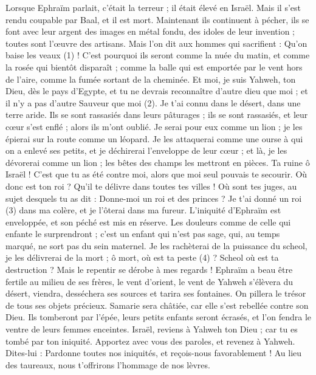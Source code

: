 \begin{multicols}{2}
\VerseOne{}Lorsque Ephraïm parlait, c’était la terreur ; il était élevé en Israël. Mais il s'est rendu coupable par Baal, et il est mort.
Maintenant ils continuent à pécher, ils se font avec leur argent des images en métal fondu, des idoles de leur invention ; toutes sont l’œuvre des artisans. Mais l’on dit aux hommes qui sacrifient : Qu’on baise les veaux (1) !
C'est pourquoi ils seront comme la nuée du matin, et comme la rosée qui bientôt disparaît ; comme la balle qui est emportée par le vent hors de l’aire, comme la fumée sortant de la cheminée.
Et moi, je suis Yahweh, ton Dieu, dès le pays d’Egypte, et tu ne devrais reconnaître d'autre dieu que moi ; et il n'y a pas d’autre Sauveur que moi (2).
Je t'ai connu dans le désert, dans une terre aride.
Ils se sont rassasiés dans leurs pâturages ; ils se sont rassasiés, et leur cœur s'est enflé ; alors ils m'ont oublié.
Je serai pour eux comme un lion ; je les épierai sur la route comme un léopard.
Je les attaquerai comme une ourse à qui on a enlevé ses petits, et je déchirerai l’enveloppe de leur cœur ; et là, je les dévorerai comme un lion ; les bêtes des champs les mettront en pièces.
Ta ruine ô Israël ! C’est que tu as été contre moi, alors que moi seul pouvais te secourir.
Où donc est ton roi ? Qu'il te délivre dans toutes tes villes ! Où sont tes juges, au sujet desquels tu as dit : Donne-moi un roi et des princes ?
Je t'ai donné un roi (3) dans ma colère, et je l'ôterai dans ma fureur.
L'iniquité d'Ephraïm est enveloppée, et son péché est mis en réserve.
Les douleurs comme de celle qui enfante le surprendront ; c'est un enfant qui n'est pas sage, qui, au temps marqué, ne sort pas du sein maternel.
Je les rachèterai de la puissance du scheol, je les délivrerai de la mort ; ô mort, où est ta peste (4) ? Scheol où est ta destruction ? Mais le repentir se dérobe à mes regards !
Ephraïm a beau être fertile au milieu de ses frères, le vent d’orient, le vent de Yahweh s’élèvera du désert, viendra, desséchera ses sources et tarira ses fontaines. On pillera le trésor de tous ses objets précieux.
Samarie sera châtiée, car elle s'est rebellée contre son Dieu. Ils tomberont par l'épée, leurs petits enfants seront écrasés, et l’on fendra le ventre de leurs femmes enceintes.
\VerseOne{}Israël, reviens à Yahweh ton Dieu ; car tu es tombé par ton iniquité.
Apportez avec vous des paroles, et revenez à Yahweh. Dites-lui : Pardonne toutes nos iniquités, et reçois-nous favorablement ! Au lieu des taureaux, nous t’offrirons l’hommage de nos lèvres.

\end{multicols}
